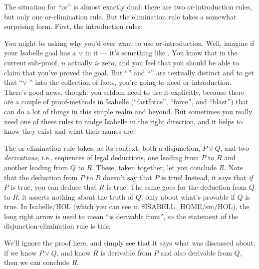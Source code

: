 The situation for ``or'' is almost exactly dual: there are two or-introduction rules, but only one or-elimination rule. But the elimination rule takes a somewhat surprising form. First, the introduction rules:

\begin{prooftree}
\end{prooftree}

\begin{prooftree}
\end{prooftree}

You might be asking why you'd ever want to use or-introduction. Well, imagine if your Isabelle goal has a  $ \vee $ in it --- it's something like . You know that in the current sub-proof, $n$ actually \textit{is} zero, and you feel that you should be able to claim that you've proved the goal. But ``'' and ``'' are textually distinct and to get that ``$\vee$ '' into the collection of facts, you're going to need or-introduction. There's good news, though: you seldom need to use it explicitly, because there are a couple of proof-methods in Isabelle (``fastforce'', ``force'', and ``blast'') that can do a lot of things in this simple realm and beyond. But sometimes you really need one of these rules to nudge Isabelle in the right direction, and it helps to know they exist and what their names are. 

The or-elimination rule takes, as its context, both a disjunction, $P \vee Q$, and two \textit{derivations}, i.e., sequences of legal deductions, one leading from $P$ to $R$ and another leading from $Q$ to $R$. These, taken together, let you conclude $R$. Note that the deduction from $P$ to $R$ doesn't say that $P$ is true! Instead, it says that \textit{if} $P$ is true, you can deduce that $R$ is true. The same goes for the deduction from $Q$ to $R$: it asserts nothing about the truth of $Q$, only about what's provable if $Q$ is true. In Isabelle/HOL (which you can see in \$ISABELL\_HOME/src/HOL), the long right arrow is used to mean ``is derivable from'', so the statement of the disjunction-elimination rule is this:


We'll ignore the proof here, and simply see that it says what was discussed about: if we know $P \vee Q$, and know $R$ is derivable from $P$ and also derivable from $Q$, then we can conclude $R$. 

